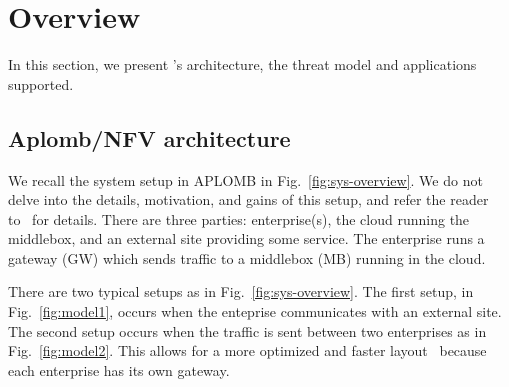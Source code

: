 


     
\section{Overview}\label{sec:overview}



In this section, we present \sys's architecture, the threat model and applications supported.


\subsection{Aplomb/NFV architecture}

We recall the system setup in APLOMB  in Fig.~\ref{fig:sys-overview}.
We do not delve into the details, motivation, and gains of this setup, and refer the reader to~\cite{aplomb} for details. 
There are three parties: enterprise(s), the cloud running the middlebox, and an external site providing
some service. 
The enterprise runs a gateway (GW) which sends traffic to a middlebox (MB) running in the cloud.

There are two typical setups as in Fig.~\ref{fig:sys-overview}.  The first setup, in Fig.~\ref{fig:model1},  occurs when the enteprise communicates with an external site. The second setup occurs when the traffic is sent between two enterprises as in Fig.~\ref{fig:model2}. This allows for a more optimized and faster layout~\cite{aplomb} because  each enterprise has its own gateway.











